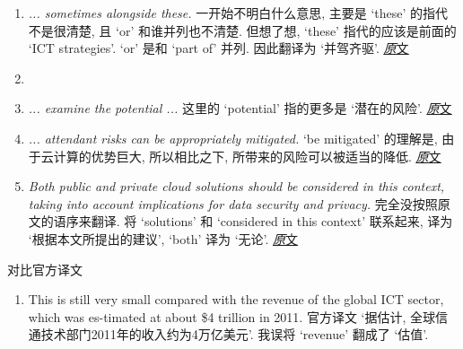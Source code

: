 \documentclass[a4paper, UTF8, 12pt]{article}
\begin{document}
\begin{enumerate}
    \item \emph{... sometimes alongside these.} 一开始不明白什么意思, 主要是 `these' 的指代不是很清楚, 且 `or' 和谁并列也不清楚. 但想了想, `these' 指代的应该是前面的 `ICT strategies'. `or' 是和 `part of' 并列. 因此翻译为 `并驾齐驱'. \hyperlink{par:01}{\underline{\emph 原文}}
    \item  \item \emph{... examine the potential ...} 这里的 `potential' 指的更多是 `潜在的风险'. \hyperlink{par:02}{\underline{\emph 原文}}
    \item \emph{... attendant risks can be appropriately mitigated.} `be mitigated' 的理解是, 由于云计算的优势巨大, 所以相比之下, 所带来的风险可以被适当的降低. \hyperlink{par:02}{\underline{\emph 原文}}
    \item \emph{Both public and private cloud solutions should be considered in this context, taking into account implications for data security and privacy.} 完全没按照原文的语序来翻译. 将 `solutions' 和 `considered in this context' 联系起来, 译为 `根据本文所提出的建议', `both' 译为 `无论'. \hyperlink{par:02}{\underline{\emph 原文}}
\end{enumerate}

对比官方译文

\begin{enumerate}
    \item This is still very small compared with the revenue of the global ICT sector, which was es-timated at about \$4 trillion in 2011. 官方译文 `据估计, 全球信通技术部门2011年的收入约为4万亿美元'. 我误将 `revenue' 翻成了 `估值'.
\end{enumerate}
\end{document}
